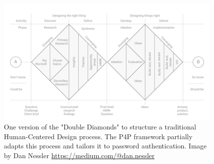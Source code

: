 \begin{figure}
	\centering
	\includegraphics[width=\linewidth]{figures/summary/hcd-design-process}
	\caption{One version of the "Double Diamonds" to structure a traditional Human-Centered Design process. The P4P framework partially adapts this process and tailors it to password authentication. Image by Dan Nessler \url{https://medium.com/@dan.nessler} }
	\label{fig:summary:hcd-design-process}
\end{figure}

